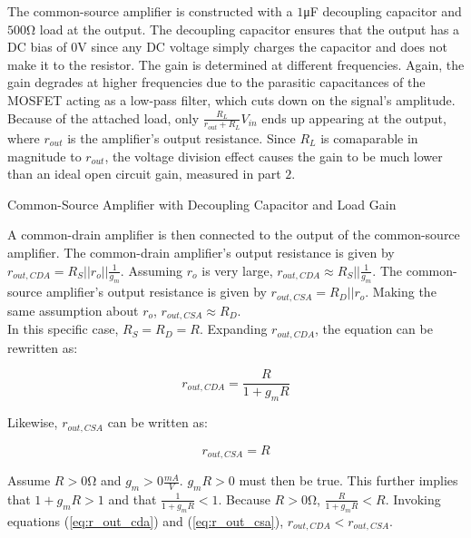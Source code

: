 The common-source amplifier is constructed with a $1$\si{\micro\farad} decoupling capacitor and $500$\si{\ohm} load at the output.
The decoupling capacitor ensures that the output has a DC bias of $0$\si{\volt} since any DC voltage simply charges the capacitor and does not make it to the resistor.
The gain is determined at different frequencies.
Again, the gain degrades at higher frequencies due to the parasitic capacitances of the MOSFET acting as a low-pass filter, which cuts down on the signal's amplitude.
Because of the attached load, only $\frac{R_{L}}{r_{out} + R_{L}}V_{in}$ ends up appearing at the output, where $r_{out}$ is the amplifier's output resistance.
Since $R_{L}$ is comaparable in magnitude to $r_{out}$, the voltage division effect causes the gain to be much lower than an ideal open circuit gain, measured in part $2$.
\FloatBarrier

\begin{table}[h!]
	\centering
	\caption{Common-Source Amplifier with Decoupling Capacitor and Load Gain}
	\label{tab:gain_part3}
\end{table}

\FloatBarrier


A common-drain amplifier is then connected to the output of the common-source amplifier.
The common-drain amplifier's output resistance is given by $r_{out,CDA} = R_{S} || r_{o} || \frac{1}{g_{m}}$.
Assuming $r_{o}$ is very large, $r_{out,CDA} \approx R_{S} || \frac{1}{g_{m}}$.
The common-source amplifier's output resistance is given by $r_{out,CSA} = R_{D} || r_{o}$.
Making the same assumption about $r_{o}$, $r_{out,CSA} \approx R_{D}$. \\

In this specific case, $R_{S} = R_{D} = R$.
Expanding $r_{out,CDA}$, the equation can be rewritten as:

\begin{equation}
	\label{eq:r_out_cda}
	r_{out,CDA} = \frac{R}{1+g_{m}R}
\end{equation}

Likewise, $r_{out,CSA}$ can be written as:

\begin{equation}
	\label{eq:r_out_csa}
	r_{out,CSA} = R
\end{equation}

Assume $R > 0$\si{\ohm} and $g_{m} > 0 \frac{mA}{V}$.
$g_{m}R > 0$ must then be true.
This further implies that $1 + g_{m}R > 1$ and that $\frac{1}{1 + g_{m}R} < 1$.
Because $R > 0$\si{\ohm}, $\frac{R}{1 + g_{m}R} < R$.
Invoking equations (\ref{eq:r_out_cda}) and (\ref{eq:r_out_csa}), $r_{out,CDA} < r_{out,CSA}$. \\

